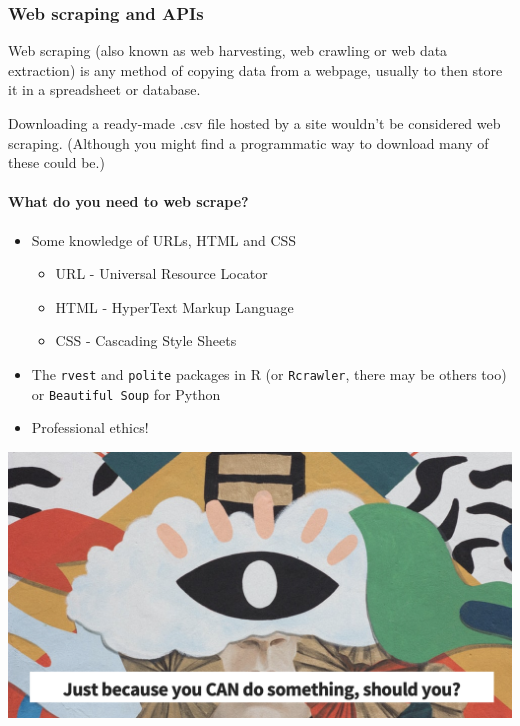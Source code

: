 \documentclass[
  openany]{book}
\providecommand{\tightlist}{%
  \setlength{\itemsep}{0pt}\setlength{\parskip}{0pt}}
\begin{document}
\hypertarget{web-scraping-and-apis}{%
\subsubsection{Web scraping and APIs}\label{web-scraping-and-apis}}

Web scraping (also known as web harvesting, web crawling or web data extraction) is any method of copying data from a webpage, usually to then store it in a spreadsheet or database.

Downloading a ready-made .csv file hosted by a site wouldn't be considered web scraping. (Although you might find a programmatic way to download many of these could be.)

\hypertarget{what-do-you-need-to-web-scrape}{%
\paragraph{What do you need to web scrape?}\label{what-do-you-need-to-web-scrape}}

\begin{itemize}
\tightlist
\item
  Some knowledge of URLs, HTML and CSS

  \begin{itemize}
  \tightlist
  \item
    URL - Universal Resource Locator
  \item
    HTML - HyperText Markup Language
  \item
    CSS - Cascading Style Sheets
  \end{itemize}
\item
  The \texttt{rvest} and \texttt{polite} packages in R (or \texttt{Rcrawler}, there may be others too) or \texttt{Beautiful\ Soup} for Python
\item
  Professional ethics!
\end{itemize}

\begin{center}\includegraphics[width=0.9\linewidth]{images/m2/you-can} \end{center}
\end{document}
